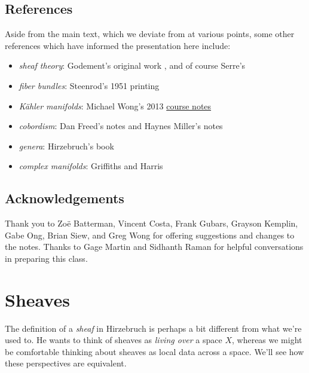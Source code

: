 \documentclass[11pt]{amsart}
\begin{document}
\subsection{References}
Aside from the main text, which we deviate from at various points, some other references which have informed the presentation here include:
\begin{itemize}
    \item \emph{sheaf theory}: Godement's original work \cite{godementTopologieAlgebriqueTheorie1958}, and of course Serre's \cite{FAC}
    \item \emph{fiber bundles}: Steenrod's 1951 printing \cite{Steenrod-fibre-bundles}
    \item \emph{K\"{a}hler manifolds}: Michael Wong's 2013 \href{https://wiki.epfl.ch/kaehler2013/notesexercises}{course notes}
    \item \emph{cobordism}: Dan Freed's notes \cite{Freed-bordism} and Haynes Miller's notes \cite{millerNotesCobordism}
    \item \emph{genera}: Hirzebruch's book \cite{MMF}
    \item \emph{complex manifolds}: Griffiths and Harris \cite{griffithsPrinciplesAlgebraicGeometry1978}
\end{itemize}

\subsection{Acknowledgements}

Thank you to Zo\"{e} Batterman, Vincent Costa, Frank Gubars, Grayson Kemplin, Gabe Ong, Brian Siew, and Greg Wong for offering suggestions and changes to the notes. Thanks to Gage Martin and Sidhanth Raman for helpful conversations in preparing this class.

\section{Sheaves}

The definition of a \emph{sheaf} in Hirzebruch is perhaps a bit different from what we're used to. He wants to think of sheaves as \emph{living over} a space $X$, whereas we might be comfortable thinking about sheaves as local data across a space. We'll see how these perspectives are equivalent.
\end{document}
